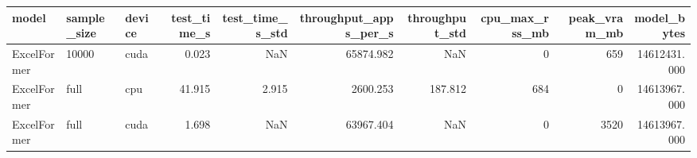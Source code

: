 \begin{tabular}{lllrrrrrrr}
\toprule
      model & sample\_size & device &  test\_time\_s &  test\_time\_s\_std &  throughput\_apps\_per\_s &  throughput\_std &  cpu\_max\_rss\_mb &  peak\_vram\_mb &  model\_bytes \\
\midrule
ExcelFormer &       10000 &   cuda &        0.023 &              NaN &              65874.982 &             NaN &               0 &           659 & 14612431.000 \\
ExcelFormer &        full &    cpu &       41.915 &            2.915 &               2600.253 &         187.812 &             684 &             0 & 14613967.000 \\
ExcelFormer &        full &   cuda &        1.698 &              NaN &              63967.404 &             NaN &               0 &          3520 & 14613967.000 \\
\bottomrule
\end{tabular}
